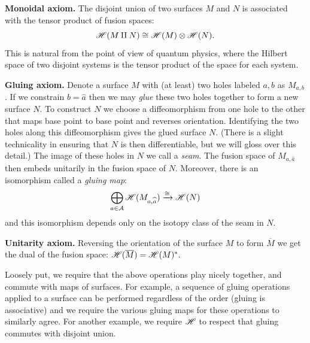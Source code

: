 \documentclass[aps, tightenlines, letterpaper, onecolumn, superscriptaddress, notitlepage, 11pt, groupedaddress]{revtex4-1}
\begin{document}
{\bf Monoidal axiom.}
The disjoint union of two surfaces $M$ and $N$ 
is associated with
the tensor product of fusion spaces:
$$
    \mathscr{H}(M\amalg N) \cong \mathscr{H}(M)\otimes \mathscr{H}(N).
$$
This is natural from the point of view of quantum
physics, where the Hilbert space of two disjoint
systems is the tensor product of the space for
each system.

{\bf Gluing axiom.}
Denote a surface $M$ with (at least) two holes
labeled $a, b$ as $M_{a,b}$. 
If we constrain $b=\widehat{a}$ 
then we may \emph{glue} these two holes together
to form a new surface $N$.
To construct $N$ we choose a diffeomorphism from one
hole to the other that maps base point to base point 
and reverses orientation.
Identifying the two holes along this diffeomorphism
gives the glued surface $N$.
(There is a slight technicality in ensuring that $N$ is
then differentiable, but we will gloss over this detail.)
The image of these holes in $N$ we call a \emph{seam}.
The fusion space of $M_{a,\widehat{a}}$ then embeds unitarily in the fusion
space of $N$.
Moreover, there is an isomorphism called
a \emph{gluing map}:
$$
    \bigoplus_{a\in\mathcal{A}} \mathscr{H}(M_{a,\widehat{a}}) \xrightarrow{\cong} \mathscr{H}(N)
$$
and this isomorphism depends only on the isotopy class of 
the seam in $N.$

{\bf Unitarity axiom.}
Reversing the orientation of the surface $M$
to form $\overline{M}$ we get the dual of the fusion space:
$\mathscr{H}(\overline{M})=\mathscr{H}(M)^*.$

Loosely put, we require that the above operations play nicely together,
and commute with maps of surfaces.
For example,
a sequence of gluing operations 
applied to a surface can
be performed regardless of the order (gluing is associative)
and we require the various gluing maps for these operations to similarly agree.
For another example, we require $\mathscr{H}$ to respect that gluing
commutes with disjoint union.
\end{document}
